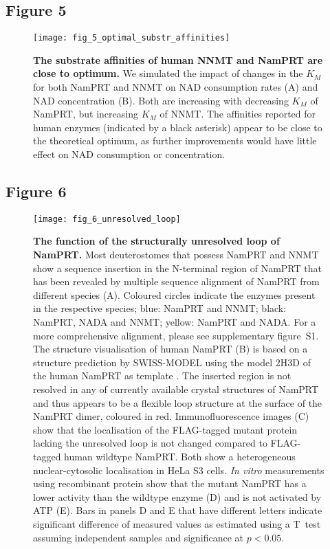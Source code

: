 \newpage


\subsection*{Figure 5}

\begin{figure}[ht]
  \centering
  \texttt{[image: fig\_5\_optimal\_substr\_affinities]}
  \caption{\textbf{The substrate affinities of human NNMT and NamPRT are close to optimum.} We simulated the impact of changes in the $K_{M}$ for both NamPRT and NNMT on NAD consumption rates (A) and NAD concentration (B). Both are increasing with decreasing $K_{M}$ of NamPRT, but increasing $K_{M}$ of NNMT. The affinities reported for human enzymes (indicated by a black asterisk) appear to be close to the theoretical optimum, as further improvements would have little effect on NAD consumption or concentration.}
  \label{fig:optimal_substr_affinities}
\end{figure}

\newpage


\subsection*{Figure 6}

\begin{figure}[ht]
  \centering
  \texttt{[image: fig\_6\_unresolved\_loop]}
  \caption{\textbf{The function of the structurally unresolved loop of NamPRT.} Most deuterostomes that possess NamPRT and NNMT show a sequence insertion in the N-terminal region of NamPRT that has been revealed by multiple sequence alignment of NamPRT from different species (A). Coloured circles indicate the enzymes present in the respective species; blue: NamPRT and NNMT; black: NamPRT, NADA and NNMT; yellow: NamPRT and NADA. For a more comprehensive alignment, please see supplementary figure~S1. The structure visualisation of human NamPRT (B) is based on a structure prediction by SWISS-MODEL \cite{Arnold2006,Biasini2014} using the model 2H3D of the human NamPRT as template \cite{Wang2006}. The inserted region is not resolved in any of currently available crystal structures of NamPRT and thus appears to be a flexible loop structure at the surface of the NamPRT dimer, coloured in red. Immunofluorescence images (C) show that the localisation of the FLAG-tagged mutant protein lacking the unresolved loop is not changed compared to FLAG-tagged human wildtype NamPRT. Both show a heterogeneous nuclear-cytosolic localisation in HeLa S3 cells. \textit{In vitro} measurements using recombinant protein show that the mutant NamPRT has a lower activity than the wildtype enzyme (D) and is not activated by ATP (E). Bars in panels D and E that have different letters indicate significant difference of measured values as estimated using a T~test assuming independent samples and significance at $p < 0.05$.}
  \label{fig:unresolved_loop}
\end{figure}

